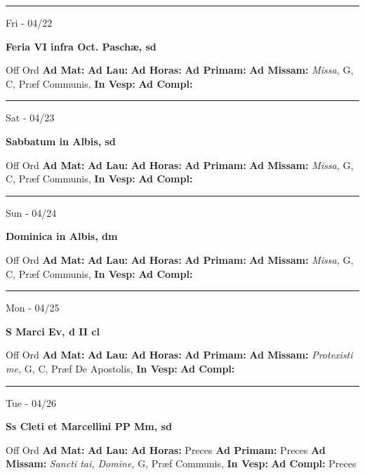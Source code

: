 \documentclass[letterpaper, 10pt]{article}
\begin{document}
\hrule
\begin{center}
Fri - 04/22
\end{center}\textbf{ \large Feria VI infra Oct. Paschæ, \textnormal{\normalsize sd}}
\begin{justify}
Off Ord
\textbf{Ad Mat: }
\textbf{Ad Lau: }
\textbf{Ad Horas: }
\textbf{Ad Primam: }
\textbf{Ad Missam:} \textit{Missa, } G, C, Præf Communis, 
\textbf{In Vesp: }
\textbf{Ad Compl: }\end{justify}



\hrule
\begin{center}
Sat - 04/23
\end{center}\textbf{ \large Sabbatum in Albis, \textnormal{\normalsize sd}}
\begin{justify}
Off Ord
\textbf{Ad Mat: }
\textbf{Ad Lau: }
\textbf{Ad Horas: }
\textbf{Ad Primam: }
\textbf{Ad Missam:} \textit{Missa, } G, C, Præf Communis, 
\textbf{In Vesp: }
\textbf{Ad Compl: }\end{justify}



\hrule
\begin{center}
Sun - 04/24
\end{center}\textbf{ \large Dominica in Albis, \textnormal{\normalsize dm}}
\begin{justify}
Off Ord
\textbf{Ad Mat: }
\textbf{Ad Lau: }
\textbf{Ad Horas: }
\textbf{Ad Primam: }
\textbf{Ad Missam:} \textit{Missa, } G, C, Præf Communis, 
\textbf{In Vesp: }
\textbf{Ad Compl: }\end{justify}



\hrule
\begin{center}
Mon - 04/25
\end{center}\textbf{ \large S Marci Ev, \textnormal{\normalsize d II cl}}
\begin{justify}
Off Ord
\textbf{Ad Mat: }
\textbf{Ad Lau: }
\textbf{Ad Horas: }
\textbf{Ad Primam: }
\textbf{Ad Missam:} \textit{Protexisti me, } G, C, Præf De Apostolis, 
\textbf{In Vesp: }
\textbf{Ad Compl: }\end{justify}



\hrule
\begin{center}
Tue - 04/26
\end{center}\textbf{ \large Ss Cleti et Marcellini PP Mm, \textnormal{\normalsize sd}}
\begin{justify}
Off Ord
\textbf{Ad Mat: }
\textbf{Ad Lau: }
\textbf{Ad Horas: }Preces
\textbf{Ad Primam: }Preces
\textbf{Ad Missam:} \textit{Sancti tai, Domine, } G, Præf Communis, 
\textbf{In Vesp: }
\textbf{Ad Compl: }Preces\end{justify}
\end{document}

